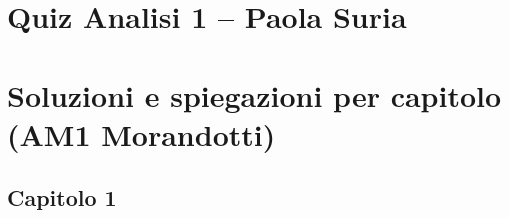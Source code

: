 \documentclass[11pt,a4paper]{article}
\newcounter{quiz}
\begin{document}
\section*{Quiz Analisi 1 -- Paola Suria}





















































\clearpage\section*{Soluzioni e spiegazioni per capitolo (AM1 Morandotti)}
\subsection*{Capitolo 1}
\end{document}
